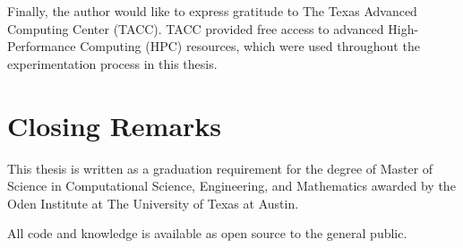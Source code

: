 Finally, the author would like to express gratitude to The Texas Advanced Computing Center (TACC).
TACC provided free access to advanced High-Performance Computing (HPC) resources,
which were used throughout the experimentation process in this thesis.

\section{Closing Remarks}

This thesis is written as a graduation requirement for the degree of Master of Science 
in Computational Science, Engineering, and Mathematics awarded by the Oden Institute at 
The University of Texas at Austin.


All code and knowledge is available as open source to the general public.